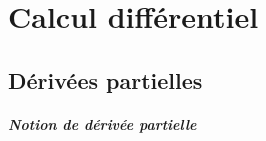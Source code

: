
\chapter{Calcul différentiel}
\section{Dérivées partielles}
%
\paragraph{Notion de dérivée partielle}
~ 
%
%
%
